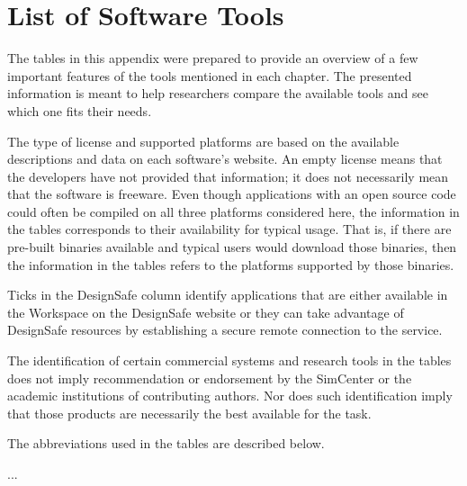 %
%
%

\chapter{List of Software Tools}

The tables in this appendix were prepared to provide an overview of a few important features of the tools mentioned in each chapter. The presented information is meant to help researchers compare the available tools and see which one fits their needs. 


The type of license and supported platforms are based on the available descriptions and data on each software's website. An empty license means that the developers have not provided that information; it does not necessarily mean that the software is freeware. Even though applications with an open source code could often be compiled on all three platforms considered here, the information in the tables corresponds to their availability for typical usage. That is, if there are pre-built binaries available and typical users would download those binaries, then the information in the tables refers to the platforms supported by those binaries.


Ticks in the DesignSafe column identify applications that are either available in the Workspace on the DesignSafe website or they can take advantage of DesignSafe resources by establishing a secure remote connection to the service. 


The identification of certain commercial systems and research tools in the tables does not imply recommendation or endorsement by the SimCenter or the academic institutions of contributing authors. Nor does such identification imply that those products are necessarily the best available for the task.


The abbreviations used in the tables are described below.

...


